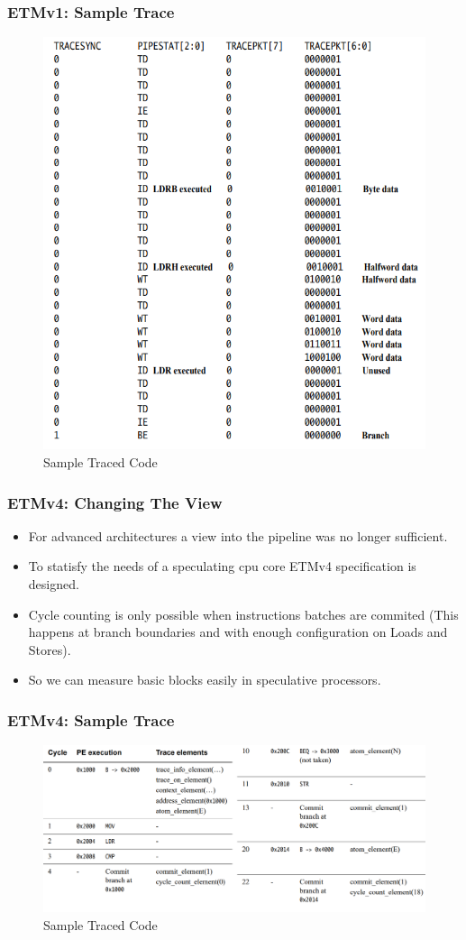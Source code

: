 \documentclass{beamer}
\begin{document}
\begin{frame}
    \frametitle{ETMv1: Sample Trace} 
    \begin{figure}
        \centering
        \includegraphics[width=0.55\columnwidth]{etmv12.png}
        \caption{Sample Traced Code}
        \label{fig:ETMv12}
    \end{figure}
\end{frame}
\begin{frame}
    \frametitle{ETMv4: Changing The View}
    \begin{itemize}
        \item For advanced architectures a view into the pipeline was no longer
            sufficient.
        \item To statisfy the needs of a speculating cpu core ETMv4
            specification is designed.
        \item Cycle counting is only possible when instructions batches are
            commited (This happens at branch boundaries and with enough
            configuration on Loads and Stores).
        \item So we can measure basic blocks easily in speculative processors.
    \end{itemize}
\end{frame}
\begin{frame}
    \frametitle{ETMv4: Sample Trace} 
        \begin{figure}
        \centering
        \includegraphics[width=0.90\columnwidth]{etmv4.png}
        \caption{Sample Traced Code}
        \label{fig:ETMv4}
    \end{figure}
\end{frame}
\end{document}
